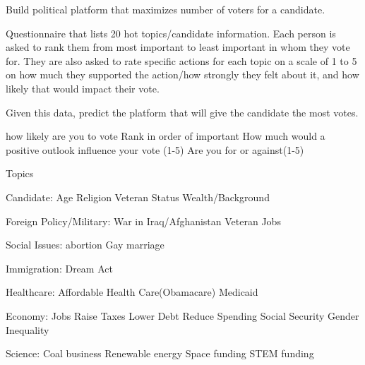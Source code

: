 \label{Ch:Estimation}



Build political platform that maximizes number of voters for a candidate.

Questionnaire that lists 20 hot topics/candidate information.  Each person is asked to rank them from most important to least important in whom they vote for. 
They are also asked to rate specific actions for each topic on a scale of 1 to 5 on how much they supported the action/how strongly they felt about it, and how likely that would impact their vote.

Given this data, predict the platform that will give the candidate the most votes.

how likely are you to vote
Rank in order of important
How much would a positive outlook influence your vote (1-5)
Are you for or against(1-5)

Topics

Candidate:
Age
Religion
Veteran Status
Wealth/Background

Foreign Policy/Military:
War in Iraq/Afghanistan
Veteran Jobs

Social Issues:
abortion
Gay marriage

Immigration:
Dream Act

Healthcare:
Affordable Health Care(Obamacare)
Medicaid

Economy:
Jobs
Raise Taxes
Lower Debt
Reduce Spending
Social Security
Gender Inequality

Science:
Coal business
Renewable energy
Space funding
STEM funding


